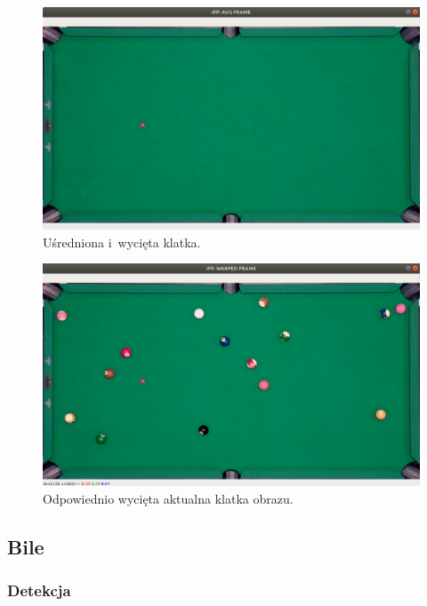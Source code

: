 \documentclass[12pt]{article}
\begin{document}
\begin{figure}[h]
    \centering
    \includegraphics[width=15cm]{./images/obrazki/ifp/avg_frame.png}
    \caption{Uśredniona i~wycięta klatka.}
    \label{avg_frame}
\end{figure}

\begin{figure}[h]
    \centering
    \includegraphics[width=15cm]{./images/obrazki/ifp/warped_frame.png}
    \caption{Odpowiednio wycięta aktualna klatka obrazu.}
    \label{warped_frame}
\end{figure}

\clearpage

\subsection{Bile}

\subsubsection{Detekcja}
\end{document}

